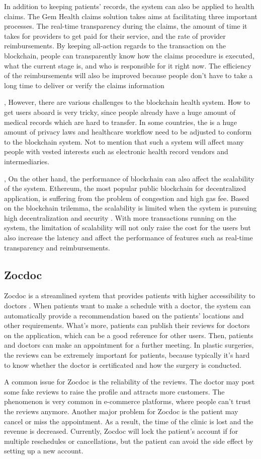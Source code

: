 \documentclass{article}
\begin{document}
\par In addition to keeping patients' records, the system can also be applied to health claims\cite{GemClaims}. The Gem Health claims solution takes aims at facilitating three important processes. The real-time transparency during the claims, the amount of time it takes for providers to get paid for their service, and the rate of provider reimbursements. By keeping all-action regards to the transaction on the blockchain, people can transparently know how the claims procedure is executed, what the current stage is, and who is responsible for it right now. The efficiency of the reimbursements will also be improved because people don't have to take a long time to deliver or verify the claims information
\par, However, there are various challenges to the blockchain health system. How to get users aboard is very tricky, since people already have a huge amount of medical records which are hard to transfer. In some countries, the is a huge amount of privacy laws and healthcare workflow need to be adjusted to conform to the blockchain system. Not to mention that such a system will affect many people with vested interests such as electronic health record vendors and intermediaries.
\par, On the other hand, the performance of blockchain can also affect the scalability of the system. Ethereum, the most popular public blockchain for decentralized application, is suffering from the problem of congestion and high gas fee. Based on the blockchain trilemma, the scalability is limited when the system is pursuing high decentralization and security \cite{trilemma}. With more transactions running on the system, the limitation of scalability will not only raise the cost for the users but also increase the latency and affect the performance of features such as real-time transparency and reimbursements.
\subsection{Zocdoc}
Zocdoc is a streamlined system that provides patients with higher accessibility to doctors \cite{zocdoc}. When patients want to make a schedule with a doctor, the system can automatically provide a recommendation based on the patients' locations and other requirements. What's more, patients can publish their reviews for doctors on the application, which can be a good reference for other users. Then, patients and doctors can make an appointment for a further meeting. In plastic surgeries, the reviews can be extremely important for patients, because typically it's hard to know whether the doctor is certificated and how the surgery is conducted.
\par A common issue for Zocdoc is the reliability of the reviews. The doctor may post some fake reviews to raise the profile and attracts more customers. The phenomenon is very common in e-commerce platforms, where people can't trust the reviews anymore. Another major problem for Zocdoc is the patient may cancel or miss the appointment. As a result, the time of the clinic is lost and the revenue is decreased. Currently, Zocdoc will lock the patient's account if for multiple reschedules or cancellations, but the patient can avoid the side effect by setting up a new account. 
\end{document}
